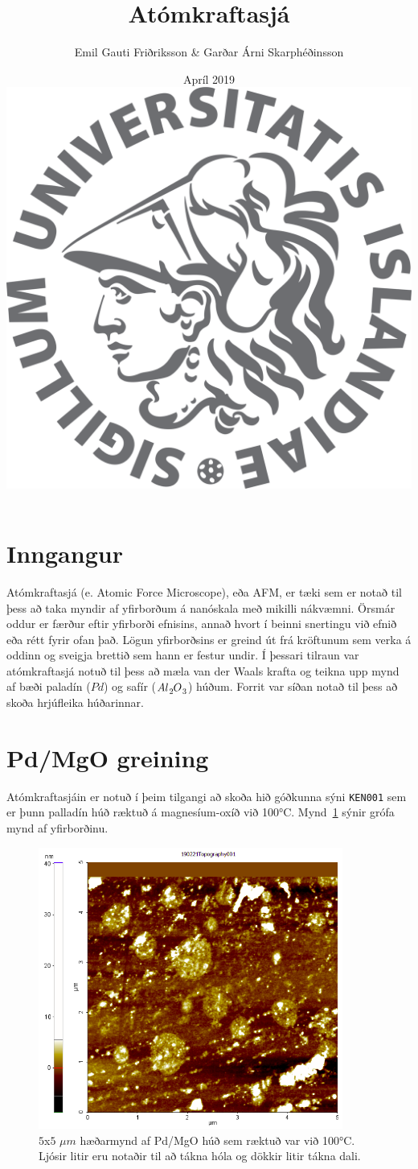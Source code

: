 \documentclass[11pt]{article}
\title{{\Huge Atómkraftasjá}}
\author{Emil Gauti Friðriksson \& Garðar Árni Skarphéðinsson}
\date{Apríl 2019 \\
\vspace{5cm}
\includegraphics[width = .6\textwidth]{HIlogo1.png}}
\begin{document}
\maketitle
\thispagestyle{empty}

\newpage

\section{Inngangur}
Atómkraftasjá (e. Atomic Force Microscope), eða AFM, er tæki sem er notað til þess að taka myndir af yfirborðum á nanóskala með mikilli nákvæmni. Örsmár oddur er færður eftir yfirborði efnisins, annað hvort í beinni snertingu við efnið eða rétt fyrir ofan það. Lögun yfirborðsins er greind út frá kröftunum sem verka á oddinn og sveigja brettið sem hann er festur undir. Í þessari tilraun var atómkraftasjá notuð til þess að mæla van der Waals krafta og teikna upp mynd af bæði paladín ($Pd$) og safír ($Al\ce{_{2}}O\ce{_3}$) húðum. Forrit var síðan notað til þess að skoða hrjúfleika húðarinnar. \\

\section{Pd/MgO greining}
Atómkraftasjáin er notuð í þeim tilgangi að skoða hið góðkunna sýni {\tt KEN001} sem er þunn palladín húð ræktuð á magnesíum-oxíð við \ang{100}C. Mynd~\ref{fig:Pd/MgO fjarmynd} sýnir grófa mynd af yfirborðinu.

\begin{figure}[H]
  \centering
    \includegraphics[width=100mm]{Ken01/Screenshot1.png}
    \caption{$5$x$5$ $\mu m$ hæðarmynd af Pd/MgO húð sem ræktuð var við \ang{100}C. Ljósir litir eru notaðir til að tákna hóla og dökkir litir tákna dali.}
    \label{fig:Pd/MgO fjarmynd}
\end{figure}
\end{document}
